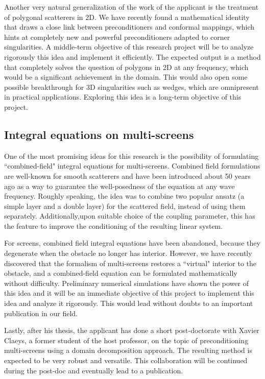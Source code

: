 \documentclass[]{article}
\begin{document}
Another very natural generalization of the work of the applicant is the treatment of polygonal scatterers in 2D. We have recently found a mathematical identity that draws a close link between preconditioners and conformal mappings, which hints at completely new and powerful preconditioners adapted to corner singularities. A middle-term objective of this research project will be to analyze rigorously this idea and implement it efficiently. The expected output is a method that completely solves the question of polygons in 2D at any frequency, which would be a significant achievement in the domain. This would also open some possible breakthrough for 3D singularities such as wedges, which are omnipresent in practical applications. Exploring this idea is a long-term objective of this project.


\subsection*{Integral equations on multi-screens}

One of the most promising ideas for this research is the possibility of formulating ``combined-field" integral equations for multi-screens. Combined field formulations are well-known for smooth scatterers and have been introduced about 50 years ago \cite{brackage} as a way to guarantee the well-posedness of the equation at any wave frequency. Roughly speaking, the idea was to combine two popular ansatz (a simple layer and a double layer) for the scattered field, instead of using them separately. Additionally,upon suitable choice of the coupling parameter, this has the feature to improve the conditioning of the resulting linear system. 

For screens, combined field integral equations have been abandoned, because they degenerate when the obstacle no longer has interior. 
However, we have recently discovered that the formalism of multi-screens restores a ``virtual" interior to the obstacle, and a combined-field equation can be formulated mathematically without difficulty. Preliminary numerical simulations have shown the power of this idea and it will be an immediate objective of this project to implement this idea and analyze it rigorously. This would lead without doubts to an important publication in our field. 

Lastly, after his thesis, the applicant has done a short post-doctorate with Xavier Claeys, a former student of the host professor, on the topic of preconditioning multi-screens using a domain decomposition approach. The resulting method is expected to be very robust and versatile. This collaboration will be continued during the post-doc and eventually lead to a publication. 
\end{document}
